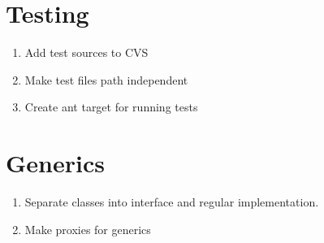 \documentclass{article}
\begin{document}
\section{Testing}
\begin{enumerate}
\item Add test sources to CVS
\item Make test files path independent
\item Create ant target for running tests
\end{enumerate}

\section{Generics}
\begin{enumerate}
\item Separate classes into interface and regular implementation.
\item Make proxies for generics
\end{enumerate}
\end{document}
